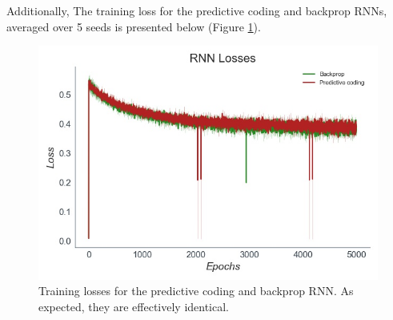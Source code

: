 Additionally, The training loss for the predictive coding and backprop RNNs, averaged over 5 seeds is presented below (Figure \ref{rnn_losses}).

\begin{figure}[ht]
  \centering
  \includegraphics[width=.7\linewidth]{chapter_6_figures/RNN_Losses_super_prelim_6.jpg}  
\caption{Training losses for the predictive coding and backprop RNN. As expected, they are effectively identical.}

\label{rnn_losses}
\end{figure}
